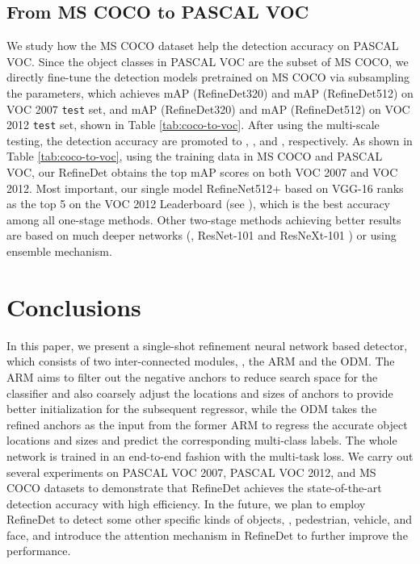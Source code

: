 \documentclass[10pt,twocolumn,letterpaper]{article}
\begin{document}
\subsection{From MS COCO to PASCAL VOC}
We study how the MS COCO dataset help the detection accuracy on PASCAL VOC. Since the object classes in PASCAL VOC are the subset of MS COCO, we directly fine-tune the detection models pretrained on MS COCO via subsampling the parameters, which achieves  mAP (RefineDet320) and  mAP (RefineDet512) on VOC 2007 {\tt test} set, and  mAP (RefineDet320) and  mAP (RefineDet512) on VOC 2012 {\tt test} set, shown in Table \ref{tab:coco-to-voc}. After using the multi-scale testing, the detection accuracy are promoted to , ,  and , respectively. As shown in Table \ref{tab:coco-to-voc}, using the training data in MS COCO and PASCAL VOC, our RefineDet obtains the top mAP scores on both VOC 2007 and VOC 2012. Most important, our single model RefineNet512+ based on VGG-16 ranks as the top 5 on the VOC 2012 Leaderboard (see \cite{voc2012-leaderboard}), which is the best accuracy among all one-stage methods. Other two-stage methods achieving better results are based on much deeper networks (\eg, ResNet-101 \cite{DBLP:conf/cvpr/HeZRS16} and ResNeXt-101 \cite{DBLP:journals/corr/XieGDTH16}) or using ensemble mechanism.

\section{Conclusions}
In this paper, we present a single-shot refinement neural network based detector, which consists of two inter-connected modules, \ie, the ARM and the ODM. The ARM aims to filter out the negative anchors to reduce search space for the classifier and also coarsely adjust the locations and sizes of anchors to provide better initialization for the subsequent regressor, while the ODM takes the refined anchors as the input from the former ARM to regress the accurate object locations and sizes and predict the corresponding multi-class labels. The whole network is trained in an end-to-end fashion with the multi-task loss. We carry out several experiments on PASCAL VOC 2007, PASCAL VOC 2012, and MS COCO datasets to demonstrate that RefineDet achieves the state-of-the-art detection accuracy with high efficiency. In the future, we plan to employ RefineDet to detect some other specific kinds of objects, \eg, pedestrian, vehicle, and face, and introduce the attention mechanism in RefineDet to further improve the performance.
\end{document}
